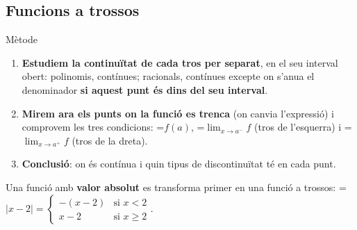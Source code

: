 \documentclass[11pt,a4paper]{article}
\newcommand{\lt}{<}\newcommand{\gt}{>}
\newcommand{\fmm}[1]{\setbox0=\hbox{$#1$}\ifdim\wd0>\linewidth\[#1\]\else\mbox{\box0}\fi}
\begin{document}
  
\subsection*{Funcions a trossos}

  
\begin{fmdef}{Mètode}
\begin{enumerate}
\item \textbf{Estudiem la continuïtat de cada tros per separat}, en el seu interval obert: polinomis, contínues; racionals, contínues excepte on s'anu\lgem{}a el denominador \textbf{si aquest punt és dins del seu interval}.
\item \textbf{Mirem ara els punts on la funció es trenca} (on canvia l'expressió) i comprovem les tres condicions: \fmm{f(a)}, \fmm{\lim_{x\to a^-}f} (tros de l'esquerra) i \fmm{\lim_{x\to a^+}f} (tros de la dreta).
\item \textbf{Conclusió}: on és contínua i quin tipus de discontinuïtat té en cada punt.
\end{enumerate}

      
\begin{fmnote}Una funció amb \textbf{valor absolut} es transforma primer en una funció a trossos: \fmm{|x-2|=\begin{cases}-(x-2)&\text{si } x\lt2\\x-2&\text{si } x\geq2\end{cases}}.\end{fmnote}
\end{fmdef}
\end{document}
